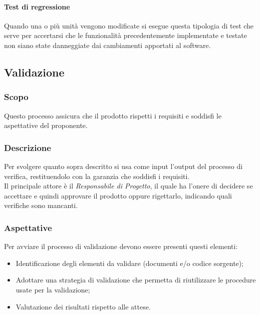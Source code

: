 \paragraph{Test di regressione}
Quando una o più unità vengono modificate si esegue questa tipologia di test che serve per accertarsi che le funzionalità precedentemente implementate e testate non siano state danneggiate dai cambiamenti apportati al software.


\subsection{Validazione}
\label{_validazione}
\subsubsection{Scopo}
Questo processo assicura che il prodotto rispetti i requisiti e soddisfi le aspettative del proponente.

\subsubsection{Descrizione}
Per svolgere quanto sopra descritto si  usa come input l'output del processo di verifica,
restituendolo con la garanzia che soddisfi i requisiti.\\
Il principale attore è il \textit{Responsabile di Progetto}, il quale ha l'onere di decidere
se accettare e quindi approvare il prodotto oppure rigettarlo, indicando quali verifiche sono mancanti.

\subsubsection{Aspettative}
Per avviare il processo di validazione devono essere presenti questi elementi:
\begin{itemize}
    \item Identificazione degli elementi da validare (documenti e/o codice sorgente);
    \item Adottare una strategia di validazione che permetta di riutilizzare le procedure usate
          per la validazione;
    \item Valutazione dei risultati rispetto alle attese.
\end{itemize}

